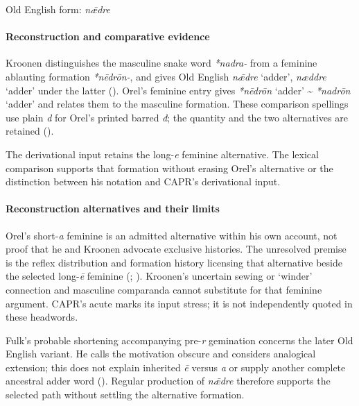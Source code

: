 \documentclass[
  british,
  a4paper,
]{article}
\providecommand{\Recon}[1]{\emph{*#1}}
\begin{document}
Old English form: \emph{nǣdre}

\paragraph{Reconstruction and comparative
evidence}\label{reconstruction-and-comparative-evidence}

Kroonen distinguishes the masculine snake word {\emph{*nadra-}} from a
feminine ablauting formation {\emph{*nēdrōn-}}, and gives Old English
{\emph{nǣdre}} `adder', {\emph{næddre}} `adder' under the latter
(). Orel's feminine
entry gives \Recon{nēdrōn} `adder' \textasciitilde{} \Recon{nadrōn}
`adder' and relates them to the masculine formation. These comparison
spellings use plain \emph{d} for Orel's printed barred \emph{đ}; the
quantity and the two alternatives are retained
().

The derivational input retains the long-\emph{e} feminine alternative.
The lexical comparison supports that formation without erasing Orel's
alternative or the distinction between his notation and CAPR's
derivational input.

\paragraph{Reconstruction alternatives and their
limits}\label{reconstruction-alternatives-and-their-limits}

Orel's short-\emph{a} feminine is an admitted alternative within his own
account, not proof that he and Kroonen advocate exclusive histories. The
unresolved premise is the reflex distribution and formation history
licensing that alternative beside the selected long-\emph{ē} feminine
(;
). Kroonen's uncertain
sewing or `winder' connection and masculine comparanda cannot substitute
for that feminine argument. CAPR's acute marks its input stress; it is
not independently quoted in these headwords.

Fulk's probable shortening accompanying pre-\emph{r} gemination concerns
the later Old English variant. He calls the motivation obscure and
considers analogical extension; this does not explain inherited \emph{ē}
versus \emph{a} or supply another complete ancestral adder word
(). Regular production of
\emph{nǣdre} therefore supports the selected path without settling the
alternative formation.
\end{document}
